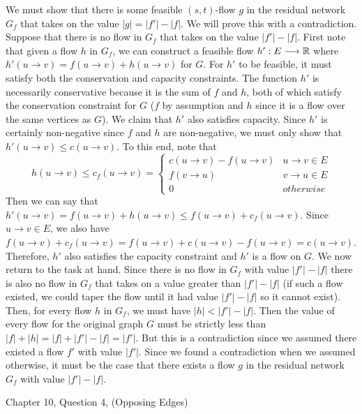 \documentclass{article}
\begin{document}
We must show that there is some feasible $(s,t)$-flow $g$ in the residual network $G_f$ that takes on the value $|g| = |f'| - |f|$.
We will prove this with a contradiction.
Suppose that there is no flow in $G_f$ that takes on the value $|f'| - |f|$. \parspace
First note that given a flow $h$ in $G_f$, we can construct a feasible flow $h': E \longrightarrow {\mathbb R}$ where $h'(u \to v) = f(u \to v) + h(u \to v)$ for $G$.
For $h'$ to be feasible, it must satisfy both the conservation and capacity constraints.
The function $h'$ is necessarily conservative because it is the sum of $f$ and $h$, both of which satisfy the conservation constraint for $G$ ($f$ by assumption and $h$ since it is a flow over the same vertices as $G$).
We claim that $h'$ also satisfies capacity.
Since $h'$ is certainly non-negative since $f$ and $h$ are non-negative, we must only show that $h'(u \to v) \leq c(u \to v)$.
To this end, note that
$$ h(u \to v) \leq c_f (u \to v) =
\begin{cases}
    c(u \to v) - f(u \to v)  & u \to v \in E \\
    f(v \to u)               & v \to u \in E \\
    0                        & otherwise
\end{cases} $$
Then we can say that $h'(u \to v) = f(u \to v) + h(u \to v) \leq f(u \to v) + c_f (u \to v)$.
Since $u \to v \in E$, we also have $f(u \to v) + c_f (u \to v) = f(u \to v) + c(u \to v) - f(u \to v) = c(u \to v)$.
Therefore, $h'$ also satisfies the capacity constraint and $h'$ is a flow on $G$. \parspace
We now return to the task at hand.
Since there is no flow in $G_f$ with value $|f'| - |f|$ there is also no flow in $G_f$ that takes on a value greater than $|f'| - |f|$ (if such a flow existed, we could taper the flow until it had value $|f'| - |f|$ so it cannot exist).
Then, for every flow $h$ in $G_f$, we must have $|h| < |f'| - |f|$.
Then the value of every flow for the original graph $G$ must be strictly less than $|f| + |h| = |f| + |f'| - |f| = |f'|$.
But this is a contradiction since we assumed there existed a flow $f'$ with value $|f'|$.
Since we found a contradiction when we assumed otherwise, it must be the case that there exists a flow $g$ in the residual network $G_f$ with value $|f'| - |f|$.



\nextprob
{}

Chapter 10, Question 4, (Opposing Edges)
\end{document}
